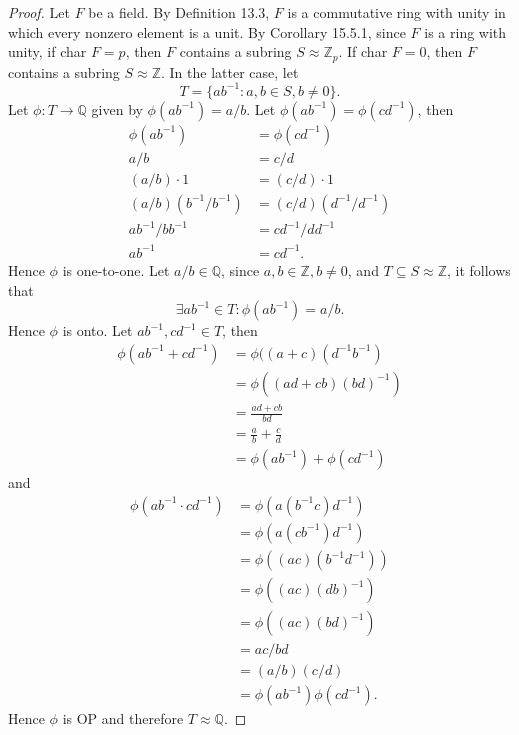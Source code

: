 \documentclass{article}
\theoremstyle{definition}
\begin{document}
\begin{proof}
     Let $F$ be a field. By Definition 13.3, $F$ is a commutative ring with unity in which every nonzero element is a unit. By Corollary 15.5.1, since $F$ is a ring with unity, if char $F=p$, then $F$ contains a subring $S\approx\mathbb{Z}_p$. If char $F=0$, then $F$ contains a subring $S\approx\mathbb{Z}$. In the latter case, let
     \begin{equation*}
         T=\{ab^{-1}:a,b\in S, b\neq0\}.
     \end{equation*}
     Let $\phi:T\to\mathbb{Q}$ given by $\phi(ab^{-1})=a/b$. Let $\phi(ab^{-1})=\phi(cd^{-1})$, then
     \begin{align*}
         \phi(ab^{-1})&=\phi(cd^{-1}) \\
         a/b&=c/d \\
         (a/b)\cdot1&=(c/d)\cdot1 \\
         (a/b)(b^{-1}/b^{-1})&=(c/d)(d^{-1}/d^{-1}) \\
         ab^{-1}/bb^{-1}&=cd^{-1}/dd^{-1} \\
         ab^{-1}&=cd^{-1}.
     \end{align*}
     Hence $\phi$ is one-to-one. Let $a/b\in\mathbb{Q}$, since $a,b\in\mathbb{Z},b\neq0$, and $T\subseteq S\approx\mathbb{Z}$, it follows that
     \begin{equation*}
         \exists ab^{-1}\in T: \phi(ab^{-1})=a/b.
     \end{equation*}
     Hence $\phi$ is onto. Let $ab^{-1},cd^{-1}\in T$, then
     \begin{align*}
         \phi(ab^{-1}+cd^{-1})&=\phi((a+c)(d^{-1}b^{-1})\\
         &=\phi((ad+cb)(bd)^{-1}) \\
         &=\frac{ad+cb}{bd} \\
         &=\frac{a}{b}+\frac{c}{d} \\
         &=\phi(ab^{-1})+\phi(cd^{-1})
     \end{align*}
     and
     \begin{align*}
         \phi(ab^{-1}\cdot cd^{-1})&=\phi(a(b^{-1}c)d^{-1}) \\
         &=\phi(a(cb^{-1})d^{-1}) \\
         &=\phi((ac)(b^{-1}d^{-1})) \\
         &=\phi((ac)(db)^{-1}) \\
         &=\phi((ac)(bd)^{-1}) \\
         &=ac/bd \\
         &=(a/b)(c/d) \\
         &=\phi(ab^{-1})\phi(cd^{-1}).
     \end{align*}
     Hence $\phi$ is OP and therefore $T\approx\mathbb{Q}$.
\end{proof}
\end{document}
